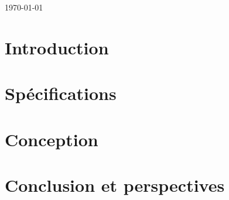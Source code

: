 \documentclass[a4paper,10pt]{report}
\begin{document}
\begin{titlepage}
	
	{\large \today}\\[3cm] 
	
	
	
	\begin{figure}[!hb]\centering
		\begin{minipage}{0.49\textwidth}\centering
		\end{minipage}
		\begin {minipage}{0.49\textwidth}\centering
		\end{minipage}
	\end{figure}
	
	
	\vfill 
	
\end{titlepage}
\tableofcontents

\chapter{Introduction}
    

\chapter{Spécifications}
    
    
\chapter{Conception}
    
    
\chapter{Conclusion et perspectives}
    
    
\end{document}
